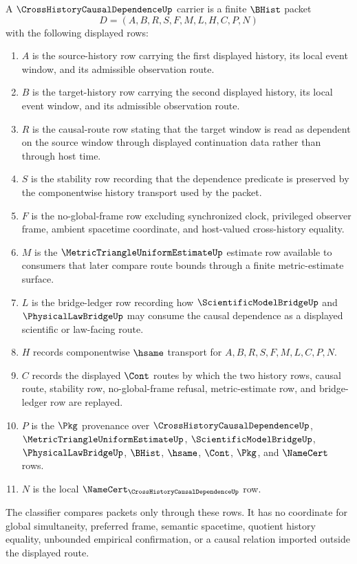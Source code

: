 \begin{definition}
\label{def:cross-history-causal-dependence-carrier}
A $\CrossHistoryCausalDependenceUp$ carrier is a finite $\BHist$ packet
$$
D=(A,B,R,S,F,M,L,H,C,P,N)
$$
with the following displayed rows:
\begin{enumerate}
\item $A$ is the source-history row carrying the first displayed history, its local event window, and its admissible observation route.
\item $B$ is the target-history row carrying the second displayed history, its local event window, and its admissible observation route.
\item $R$ is the causal-route row stating that the target window is read as dependent on the source window through displayed continuation data rather than through host time.
\item $S$ is the stability row recording that the dependence predicate is preserved by the componentwise history transport used by the packet.
\item $F$ is the no-global-frame row excluding synchronized clock, privileged observer frame, ambient spacetime coordinate, and host-valued cross-history equality.
\item $M$ is the $\MetricTriangleUniformEstimateUp$ estimate row available to consumers that later compare route bounds through a finite metric-estimate surface.
\item $L$ is the bridge-ledger row recording how $\ScientificModelBridgeUp$ and $\PhysicalLawBridgeUp$ may consume the causal dependence as a displayed scientific or law-facing route.
\item $H$ records componentwise $\hsame$ transport for $A,B,R,S,F,M,L,C,P,N$.
\item $C$ records the displayed $\Cont$ routes by which the two history rows, causal route, stability row, no-global-frame refusal, metric-estimate row, and bridge-ledger row are replayed.
\item $P$ is the $\Pkg$ provenance over $\CrossHistoryCausalDependenceUp$, $\MetricTriangleUniformEstimateUp$, $\ScientificModelBridgeUp$, $\PhysicalLawBridgeUp$, $\BHist$, $\hsame$, $\Cont$, $\Pkg$, and $\NameCert$ rows.
\item $N$ is the local $\NameCert_{\CrossHistoryCausalDependenceUp}$ row.
\end{enumerate}
The classifier compares packets only through these rows. It has no coordinate for global simultaneity, preferred frame, semantic spacetime, quotient history equality, unbounded empirical confirmation, or a causal relation imported outside the displayed route.
\end{definition}

